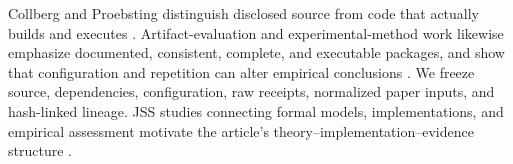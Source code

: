Collberg and Proebsting distinguish disclosed source from code that actually builds and executes \citep{collberg2016repeatability}. Artifact-evaluation and experimental-method work likewise emphasize documented, consistent, complete, and executable packages, and show that configuration and repetition can alter empirical conclusions \citep{hermann2020artifacts,klees2018fuzz,kessel2024openscience,liu2024artifacts}. We freeze source, dependencies, configuration, raw receipts, normalized paper inputs, and hash-linked lineage. JSS studies connecting formal models, implementations, and empirical assessment motivate the article's theory--implementation--evidence structure \citep{stachtiari2018correctness,alam2021dbverify,song2023continuous,coppa2024concolic}.
